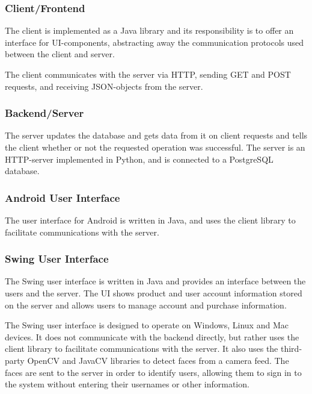 \documentclass[11pt]{article}
\begin{document}
\subsubsection{Client/Frontend}
The client is implemented as a Java library and its responsibility is
to offer an interface for UI-components, abstracting away the
communication protocols used between the client and server. 

The client communicates with the server via HTTP, sending GET and POST
requests, and receiving JSON-objects from the server. 


\subsubsection{Backend/Server}
The server updates the database and gets data from it on client
requests and tells the client whether or not the requested operation
was successful. The server is an HTTP-server implemented in Python, and
is connected to a PostgreSQL database. 

\subsubsection{Android User Interface}

The user interface for Android is written in Java, and uses the client
library to facilitate communications with the server.

\subsubsection{Swing User Interface}
     
The Swing user interface is written in Java and provides an interface
between the users and the server. The UI shows product and user account
information stored on the server and allows users to manage account
and purchase information.

The Swing user interface is designed to operate on Windows, Linux and
Mac devices. It does not communicate with the backend directly, but rather
uses the client library to facilitate communications with the server.
It also uses the third-party OpenCV and JavaCV libraries to detect faces
from a camera feed. The faces are sent to the server in order to identify
users, allowing them to sign in to the system without entering their
usernames or other information.
\end{document}
